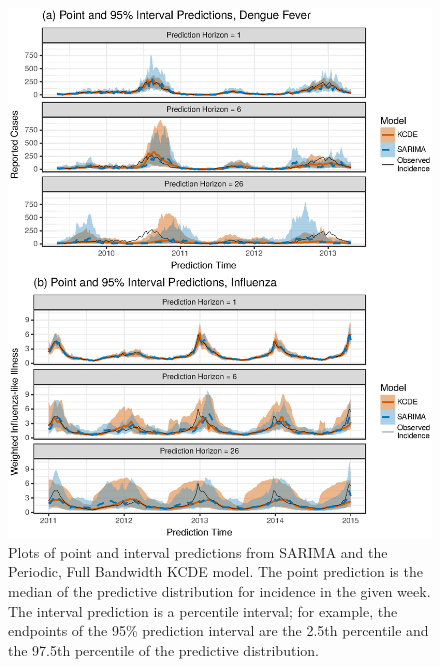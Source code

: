 \documentclass[times, doublespace]{simauth}\usepackage[]{graphicx}\usepackage[]{color}
\makeatletter
\def\maxwidth{ %
  \ifdim\Gin@nat@width>\linewidth
    \linewidth
  \else
    \Gin@nat@width
  \fi
}
\newenvironment{knitrout}{}{} %
\makeatother
\begin{document}
\begin{figure}
\begin{knitrout}
\color{fgcolor}
\includegraphics[width=\maxwidth]{figure/Fig5_Evan_L_Ray_DengueDataRibbonsPredictionPlot95Intervals-1} 

\end{knitrout}
\caption{Plots of point and interval predictions from SARIMA and the
Periodic, Full Bandwidth KCDE model.  The point prediction is the median of the predictive
distribution for incidence in the given week.  The interval prediction is a percentile interval; for example, the endpoints of the 95\% prediction interval are the 2.5th percentile and the 97.5th percentile of the predictive distribution.}
\label{fig:DengueRibbonsPredictions}
\end{figure}
\end{document}
